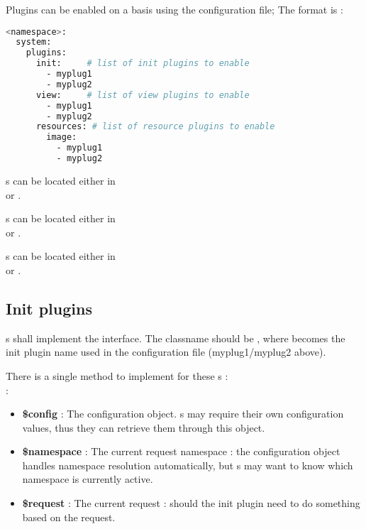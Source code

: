 \documentclass[pdftex,12pt,a4paper]{article}
\begin{document}
Plugins can be enabled on a  basis using the configuration file; The format is :
\label{code:plugin-config}
\begin{lstlisting}[label="plugin-config",caption="Config format for plugins",language=bash]
<namespace>:
  system:
    plugins:
      init: 	# list of init plugins to enable
        - myplug1
        - myplug2
      view:		# list of view plugins to enable
        - myplug1
        - myplug2
      resources: # list of resource plugins to enable
        image:
          - myplug1
          - myplug2
\end{lstlisting}

s can be located either in \\
 or .

s can be located either in \\
 or .

s can be located either in \\
 or .

\subsection{Init plugins} \label{sec:init-plugins}

s shall implement the  interface. The classname should be , where  becomes the init plugin name used in the configuration file (\eg myplug1/myplug2 above).

There is a single method to implement for these s : \\
 :
\begin{itemize}
	\item \textbf{\$config} : The configuration object. s may require their own configuration values, thus they can retrieve them through this object.
	\item \textbf{\$namespace} : The current request namespace : the configuration object handles namespace resolution automatically, but s may want to know which namespace is currently active.
	\item \textbf{\$request} : The current request : should the init plugin need to do something based on the request.
\end{itemize}
\end{document}
